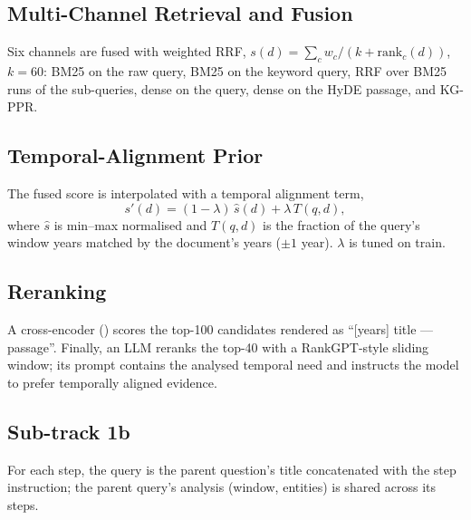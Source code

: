 \subsection{Multi-Channel Retrieval and Fusion}
Six channels are fused with weighted RRF,
$s(d) = \sum_{c} w_c / (k + \mathrm{rank}_c(d))$, $k{=}60$:
BM25 on the raw query, BM25 on the keyword query, RRF over BM25 runs of the sub-queries,
dense on the query, dense on the HyDE passage, and KG-PPR.

\subsection{Temporal-Alignment Prior}
The fused score is interpolated with a temporal alignment term,
\begin{equation}
  s'(d) = (1-\lambda)\,\widehat{s}(d) + \lambda\, T(q,d),
\end{equation}
where $\widehat{s}$ is min--max normalised and $T(q,d)$ is the fraction of the query's window
years matched by the document's years ($\pm1$ year). $\lambda$ is tuned on train.

\subsection{Reranking}
A cross-encoder () scores the top-100 candidates rendered as
``[years] title --- passage''. Finally, an LLM reranks the top-40 with a RankGPT-style
sliding window; its prompt contains the analysed temporal need and instructs the model to prefer
temporally aligned evidence.

\subsection{Sub-track 1b}
For each step, the query is the parent question's title concatenated with the step instruction;
the parent query's analysis (window, entities) is shared across its steps.
